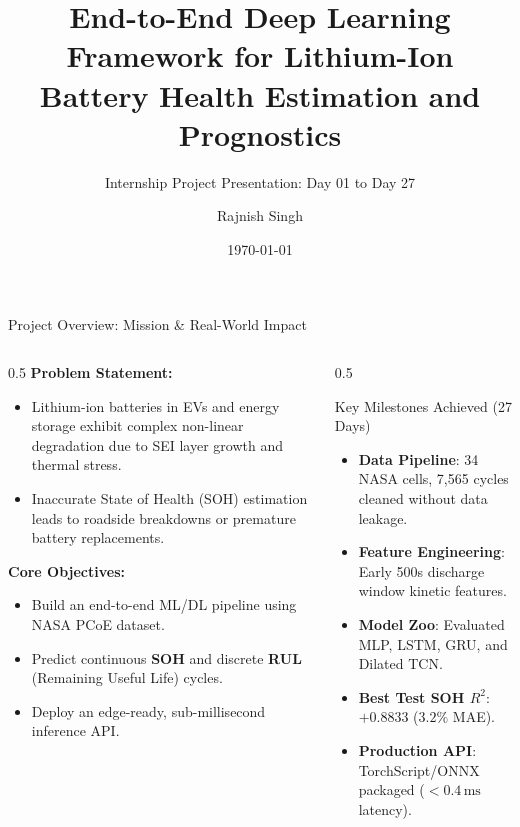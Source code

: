 \documentclass[aspectratio=169, 10pt]{beamer}
\title[Battery SOH \& RUL Prognostics]{End-to-End Deep Learning Framework for Lithium-Ion Battery Health Estimation and Prognostics}
\subtitle{Internship Project Presentation: Day 01 to Day 27}
\author[Rajnish Singh]{Rajnish Singh}
\institute[IIT Guwahati]{Indian Institute of Technology Guwahati (IIT-G)}
\date{\today}
\begin{document}
\begin{frame}
    \titlepage
\end{frame}

\begin{frame}{Project Overview: Mission \& Real-World Impact}
\begin{columns}[T]
    \begin{column}{0.5\textwidth}
        \textbf{Problem Statement:}
        \begin{itemize}
            \item Lithium-ion batteries in EVs and energy storage exhibit complex non-linear degradation due to SEI layer growth and thermal stress.
            \item Inaccurate State of Health (SOH) estimation leads to roadside breakdowns or premature battery replacements.
        \end{itemize}
        \vspace{0.3cm}
        \textbf{Core Objectives:}
        \begin{itemize}
            \item Build an end-to-end ML/DL pipeline using NASA PCoE dataset.
            \item Predict continuous \textbf{SOH} and discrete \textbf{RUL} (Remaining Useful Life) cycles.
            \item Deploy an edge-ready, sub-millisecond inference API.
        \end{itemize}
    \end{column}
    \begin{column}{0.5\textwidth}
        \begin{block}{Key Milestones Achieved (27 Days)}
            \begin{itemize}
                \item \textbf{Data Pipeline}: 34 NASA cells, 7,565 cycles cleaned without data leakage.
                \item \textbf{Feature Engineering}: Early 500s discharge window kinetic features.
                \item \textbf{Model Zoo}: Evaluated MLP, LSTM, GRU, and Dilated TCN.
                \item \textbf{Best Test SOH $R^2$}: $\mathbf{+0.8833}$ ($3.2\%$ MAE).
                \item \textbf{Production API}: TorchScript/ONNX packaged ($<0.4\,\text{ms}$ latency).
            \end{itemize}
        \end{block}
    \end{column}
\end{columns}
\end{frame}
\end{document}
